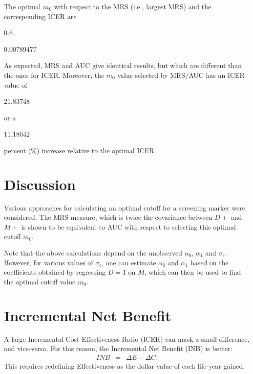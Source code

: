 \documentclass[11pt]{article}
\begin{document}
The optimal $m_0$ with respect to the MRS (i.e., largest MRS) and the corresponding ICER are
\begin{Schunk}
\begin{Soutput}
[1] 0.6
\end{Soutput}
\begin{Soutput}
[1] 0.00789477
\end{Soutput}
\end{Schunk}
As expected, MRS and AUC give identical results, but which are different than the ones for ICER. Moreover, the $m_0$ value selected by MRS/AUC has an ICER value of 
\begin{Schunk}
\begin{Soutput}
[1] 21.83748
\end{Soutput}
\end{Schunk}
or a 
\begin{Schunk}
\begin{Soutput}
[1] 11.18642
\end{Soutput}
\end{Schunk}
percent (\%) increase relative to the optimal ICER.


\section{Discussion}

Various approaches for calculating an optimal cutoff for a screening marker were considered. The MRS measure, which is twice the covariance between $D+$ and $M+$ is shown to be equivalent to AUC with respect to selecting this optimal cutoff $m_0$. 

Note that the above calculations depend on the unobserved $\alpha_0$, $\alpha_1$ and $\sigma_\epsilon$. However, for various values of $\sigma_\epsilon$, one can estimate $\alpha_0$ and $\alpha_1$ based on the coefficients obtained by regressing $D=1$ on $M$, which can then be used to find the optimal cutoff value $m_0$. 



\section{Incremental Net Benefit}

A large Incremental Cost-Effectiveness Ratio (ICER) can mask a small difference, and vice-versa.  For this reason, the Incremental Net Benefit (INB) is better:
\begin{eqnarray*}
INB &=& \Delta E - \Delta C.
\end{eqnarray*}
This requires redefining Effectiveness as the dollar value of each life-year gained.
\end{document}
